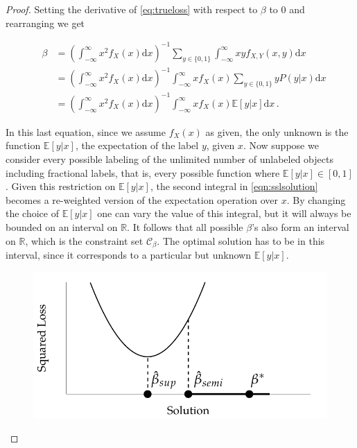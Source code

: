 \documentclass[twoside]{memoir}\usepackage[]{graphicx}\usepackage{xcolor}
\makeatletter
\def\maxwidth{ %
  \ifdim\Gin@nat@width>\linewidth
    \linewidth
  \else
    \Gin@nat@width
  \fi
}
\newenvironment{knitrout}{}{} %
\newcommand{\Cb}{\mathcal{C}_{\beta}}
\makeatother
\begin{document}
\begin{proof}

Setting the derivative of \eqref{eq:trueloss} with respect to $\beta$ to $0$ and rearranging we get

\begin{eqnarray}
&\beta & = \left( \int_{-\infty}^{\infty} { x^2 f_X(x) \mathrm{d}x} \right)^{-1} \sum_{y \in \{0,1\}} \int_{-\infty}^{\infty} { x y f_{X,Y}(x,y) \mathrm{d}x } \\
& & =    \left( \int_{-\infty}^{\infty} { x^2 f_X(x) \mathrm{d}x} \right)^{-1}  \int_{-\infty}^{\infty} { x f_X(x) \sum_{y \in \{0,1\}} y P(y|x) \mathrm{d}x} \\
& & =   \left( \int_{-\infty}^{\infty} { x^2 f_X(x) \mathrm{d}x} \right)^{-1}  \int_{-\infty}^{\infty} { x f_X(x) \mathbb{E}[y|x] \mathrm{d}x} \, . \label{eqn:sslsolution}
\end{eqnarray}

In this last equation, since we assume $f_X(x)$ as given, the only unknown is the function $\mathbb{E}[y|x]$, the expectation of the label $y$, given $x$. Now suppose we consider every possible labeling of the unlimited number of unlabeled objects including fractional labels, that is, every possible function where $\mathbb{E}[y|x] \in [0,1]$. Given this restriction on $\mathbb{E}[y|x]$, the second integral in \eqref{eqn:sslsolution} becomes a re-weighted version of the expectation operation over $x$. By changing the choice of $\mathbb{E}[y|x]$ one can vary the value of this integral, but it will always be bounded on an interval on $\mathbb{R}$. It follows that all possible $\beta$'s also form an interval on $\mathbb{R}$, which is the constraint set $\Cb$. The optimal solution has to be in this interval, since it corresponds to a particular but unknown $\mathbb{E}[y|x]$.

\begin{knitrout}
\color{fgcolor}\begin{figure}

{\centering \includegraphics[width=\maxwidth]{figure/constrainedproblem-1} 

}
\end{figure}
\end{knitrout}
\end{proof}
\end{document}
